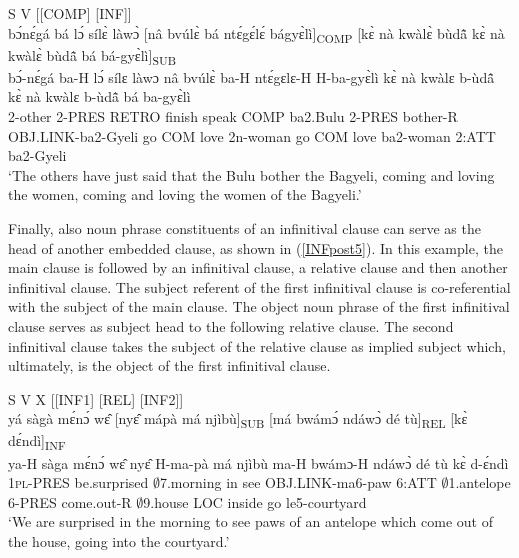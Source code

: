 \begin{exe} 
\ex\label{INFpost4} S V [[COMP] [INF]]\\
  \glll bɔ́nɛ́gá bá lɔ́ sílɛ̀ làwɔ̀ [nâ bvúlɛ̀ bá ntɛ́gɛ́lɛ́ bágyɛ̀lì]\textsubscript{COMP} [kɛ̀ nà kwàlɛ̀ bùdã̂ kɛ̀ nà kwàlɛ̀ bùdã̂ bá bá-gyɛ̀lì]\textsubscript{SUB} \\
      bɔ́-nɛ́gá ba-H lɔ́ sílɛ làwɔ nâ bvúlɛ̀ ba-H ntɛ́gɛlɛ-H H-ba-gyɛ̀lì kɛ̀ nà kwàlɛ b-ùdã̂ kɛ̀ nà kwàlɛ b-ùdã̂ bá ba-gyɛ̀lì \\
        2-other 2-PRES RETRO  finish speak COMP ba2.Bulu 2-PRES bother-R OBJ.LINK-ba2-Gyeli go COM love 2n-woman go COM love ba2-woman  2:ATT ba2-Gyeli\\
    \trans `The others have just said that the Bulu bother the Bagyeli, coming and loving the women, coming and loving the women of the Bagyeli.'
\end{exe}

Finally, also noun phrase constituents of an infinitival clause can serve as the head of another embedded clause, as shown in (\ref{INFpost5}). In this example, the main clause is followed by an infinitival clause, a relative clause and then another infinitival clause. The subject referent of the first infinitival clause is co-referential with the subject of the main clause. The object noun phrase of the first infinitival clause serves as subject head to the following relative clause. The second infinitival clause takes the subject of the relative clause as implied subject which, ultimately, is the object of the first infinitival clause.

\begin{exe} 
\ex\label{INFpost5} S V X [[INF1] [REL] [INF2]]\\
  \glll   yá sàgà mɛ́nɔ́ wɛ̂ [nyɛ̂ mápà má njìbù]\textsubscript{SUB} [má bwámɔ́ ndáwɔ̀ dé tù]\textsubscript{REL} [kɛ̀ dɛ́ndì]\textsubscript{INF} \\
          ya-H sàga mɛ́nɔ́ wɛ̂ nyɛ̂ H-ma-pà má njìbù ma-H bwámɔ-H ndáwɔ̀ dé tù kɛ̀ d-ɛ́ndì \\
        1\textsc{pl}-PRES be.surprised $\emptyset$7.morning in see OBJ.LINK-ma6-paw 6:ATT $\emptyset$1.antelope 6-PRES come.out-R $\emptyset$9.house LOC inside go le5-courtyard \\
    \trans `We are surprised in the morning to see paws of an antelope which come out of the house, going into the courtyard.'
\end{exe}




